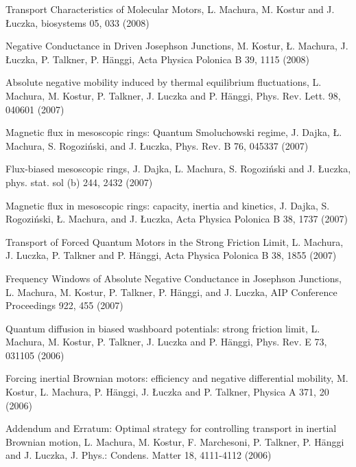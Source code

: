 \begin{etaremune}
\item Transport Characteristics of Molecular Motors, L. Machura, M. Kostur and J. Łuczka, biosystems 05,  033 (2008)

\item Negative Conductance in Driven Josephson Junctions, M. Kostur, Ł. Machura, J. Łuczka, P. Talkner, P. Hänggi, Acta Physica Polonica B 39,  1115 (2008)

\item Absolute negative mobility induced by thermal equilibrium fluctuations, L. Machura, M. Kostur, P. Talkner, J. Luczka and P. Hänggi, Phys. Rev. Lett. 98,  040601 (2007)

\item Magnetic flux in mesoscopic rings: Quantum Smoluchowski regime, J. Dajka, Ł. Machura, S. Rogoziński, and J. Łuczka, Phys. Rev. B 76,  045337 (2007)

\item Flux-biased mesoscopic rings, J. Dajka, L. Machura, S. Rogoziński and J. Łuczka, phys. stat. sol (b) 244,  2432 (2007)

\item Magnetic flux in mesoscopic rings: capacity, inertia and kinetics, J. Dajka, S. Rogoziński, Ł. Machura, and J. Łuczka, Acta Physica Polonica B 38,  1737 (2007)

\item Transport of Forced Quantum Motors in the Strong Friction Limit, L. Machura, J. Luczka, P. Talkner and P. Hänggi, Acta Physica Polonica B 38,  1855 (2007)

\item Frequency Windows of Absolute Negative Conductance in Josephson Junctions, L. Machura, M. Kostur, P. Talkner, P. Hänggi, and J. Luczka, AIP Conference Proceedings 922,  455 (2007)

\item Quantum diffusion in biased washboard potentials: strong friction limit, L. Machura, M. Kostur, P. Talkner, J. Luczka and P. Hänggi, Phys. Rev. E 73,  031105 (2006)

\item Forcing inertial Brownian motors: efficiency and negative differential mobility, M. Kostur, L. Machura, P. Hänggi, J. Łuczka and P. Talkner, Physica A 371,  20 (2006)

\item Addendum and Erratum: Optimal strategy for controlling transport in inertial Brownian motion, L. Machura, M. Kostur, F. Marchesoni, P. Talkner, P. Hänggi and J. Luczka, J. Phys.: Condens. Matter 18,  4111-4112 (2006)


\end{etaremune}
